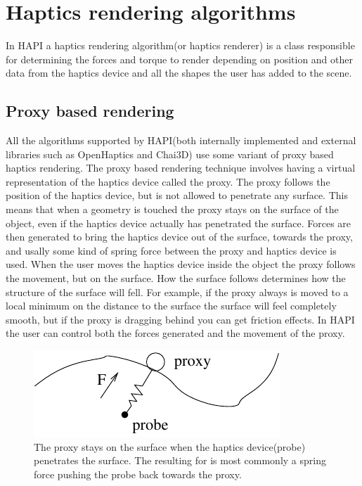 
\chapter {Haptics rendering algorithms}
In HAPI a haptics rendering algorithm(or haptics renderer) is a class
responsible for determining the forces and torque to render depending
on position and other data from the haptics device and all the shapes
the user has added to the scene. 

\section{Proxy based rendering}
All the algorithms supported by HAPI(both internally implemented and
external libraries such as OpenHaptics and Chai3D) use some variant of
proxy based haptics rendering. The proxy based rendering technique
involves having a virtual representation of the haptics device called
the proxy. The proxy follows the position of the haptics device, but
is not allowed to penetrate any surface. This means that when a
geometry is touched the proxy stays on the surface of the object, even
if the haptics device actually has penetrated the surface. Forces are
then generated to bring the haptics device out of the surface, towards
the proxy, and usally some kind of spring force between the proxy and
haptics device is used. When the user moves the haptics device inside
the object the proxy follows the movement, but on the surface. How the
surface follows determines how the structure of the surface will
fell. For example, if the proxy always is moved to a local minimum on
the distance to the surface the surface will feel completely smooth,
but if the proxy is dragging behind you can get friction effects. In
HAPI the user can control both the forces generated and the movement
of the proxy.

\begin{figure} 
  \centering 
  \includegraphics{images/proxyfinger.pdf}
  \caption{The proxy stays on the surface when the haptics
  device(probe) penetrates the surface. The resulting for is most
  commonly a spring force pushing the probe back towards the proxy.} 
  \label{Proxy-probe} 
\end{figure}



